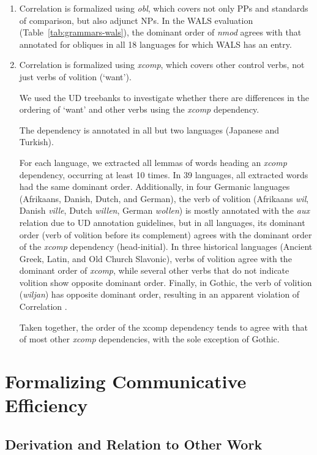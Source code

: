 \documentclass[10pt,twoside,lineno]{article}
\begin{document}
\begin{enumerate}
\item Correlation {} is formalized using \emph{obl}, which covers not only PPs and standards of comparison, but also adjunct NPs.
In the WALS evaluation (Table~\ref{tab:grammars-wals}), the dominant order of \emph{nmod} agrees with that annotated for obliques in all 18 languages for which WALS has an entry.
	
\item Correlation {} is formalized using \emph{xcomp}, which covers other control verbs, not just verbs of volition (`want').

We used the UD treebanks to investigate whether there are differences in the ordering of `want' and other verbs using the \emph{xcomp} dependency.

The dependency is annotated in all but two languages (Japanese and Turkish).

For each language, we extracted all lemmas of words heading an \emph{xcomp} dependency, occurring at least 10 times.
In 39 languages, all extracted words had the same dominant order.
Additionally, in four Germanic languages (Afrikaans, Danish, Dutch, and German), the verb of volition (Afrikaans \emph{wil}, Danish \emph{ville}, Dutch \emph{willen}, German \emph{wollen}) is mostly annotated with the \emph{aux} relation due to UD annotation guidelines, but in all languages, its dominant order (verb of volition before its complement) agrees with the dominant order of the \emph{xcomp} dependency (head-initial).
In three historical languages (Ancient Greek, Latin, and Old Church Slavonic), verbs of volition agree with the dominant order of \emph{xcomp}, while several other verbs that do not indicate volition show opposite dominant order.
Finally, in Gothic, the verb of volition (\emph{wiljan}) has opposite dominant order, resulting in an apparent violation of Correlation .

Taken together, the order of the xcomp dependency tends to agree with that of most other \emph{xcomp} dependencies, with the sole exception of Gothic.
\end{enumerate}

\section{Formalizing Communicative Efficiency}
\subsection{Derivation and Relation to Other Work}
\end{document}
